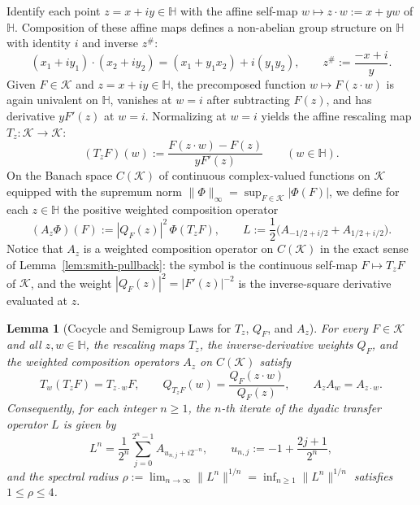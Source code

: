 \documentclass[12pt]{article}
\def\H{\mathbb{H}}
\def\K{\mathcal{K}}
\newtheorem{lemma}[thm]{Lemma}
\theoremstyle{definition}
\numberwithin{equation}{section}
\begin{document}
Identify each point $z = x+iy \in \H$ with the affine self-map $w \mapsto z \cdot w := x + yw$ of $\H$. Composition of these affine maps defines a non-abelian group structure on $\H$ with identity $i$ and inverse $z^\#$:
\begin{equation}\label{eq:affine-group}
  (x_1 + i y_1) \cdot (x_2 + i y_2) = (x_1 + y_1 x_2) + i (y_1 y_2), \qquad z^\# := \frac{-x + i}{y}.
\end{equation}
Given $F \in \K$ and $z = x+iy \in \H$, the precomposed function $w \mapsto F(z \cdot w)$ is again univalent on $\H$, vanishes at $w = i$ after subtracting $F(z)$, and has derivative $y F'(z)$ at $w = i$. Normalizing at $w = i$ yields the affine rescaling map $T_z : \K \to \K$:
\begin{equation}\label{eq:Tz-def}
  (T_z F)(w) := \frac{F(z \cdot w) - F(z)}{y F'(z)} \qquad (w \in \H).
\end{equation}
On the Banach space $C(\K)$ of continuous complex-valued functions on $\K$ equipped with the supremum norm $\|\Phi\|_\infty = \sup_{F \in \K} |\Phi(F)|$, we define for each $z \in \H$ the positive weighted composition operator
\begin{equation}\label{eq:Az-L-def}
  (A_z \Phi)(F) := |Q_F(z)|^2 \, \Phi(T_z F), \qquad L := \frac{1}{2}\Big(A_{-1/2 + i/2} + A_{1/2 + i/2}\Big).
\end{equation}
Notice that $A_z$ is a weighted composition operator on $C(\K)$ in the exact sense of Lemma~\ref{lem:smith-pullback}: the symbol is the continuous self-map $F \mapsto T_z F$ of $\K$, and the weight $|Q_F(z)|^2 = |F'(z)|^{-2}$ is the inverse-square derivative evaluated at $z$.

\begin{lemma}[Cocycle and Semigroup Laws for $T_z$, $Q_F$, and $A_z$]\label{lem:cocycle}
For every $F \in \K$ and all $z, w \in \H$, the rescaling maps $T_z$, the inverse-derivative weights $Q_F$, and the weighted composition operators $A_z$ on $C(\K)$ satisfy
\begin{equation}\label{eq:cocycle-relations}
  T_w(T_z F) = T_{z \cdot w} F, \qquad Q_{T_z F}(w) = \frac{Q_F(z \cdot w)}{Q_F(z)}, \qquad A_z A_w = A_{z \cdot w}.
\end{equation}
Consequently, for each integer $n \ge 1$, the $n$-th iterate of the dyadic transfer operator $L$ is given by
\begin{equation}\label{eq:Ln-formula}
  L^n = \frac{1}{2^n} \sum_{j=0}^{2^n - 1} A_{u_{n, j} + i 2^{-n}}, \qquad u_{n, j} := -1 + \frac{2j + 1}{2^n},
\end{equation}
and the spectral radius $\rho := \lim_{n \to \infty} \|L^n\|^{1/n} = \inf_{n \ge 1} \|L^n\|^{1/n}$ satisfies $1 \le \rho \le 4$.
\end{lemma}
\end{document}
